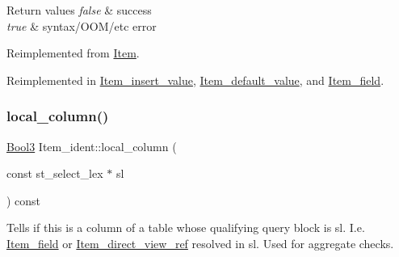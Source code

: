 \begin{DoxyRetVals}{Return values}
{\em false} & success \\
\hline
{\em true} & syntax/\+O\+O\+M/etc error \\
\hline
\end{DoxyRetVals}


Reimplemented from \mbox{\hyperlink{classItem_a0757839d09aa77bfd92bfe071f257ae9}{Item}}.



Reimplemented in \mbox{\hyperlink{classItem__insert__value_a113d00e28d63795bfd89d65dad61e769}{Item\+\_\+insert\+\_\+value}}, \mbox{\hyperlink{classItem__default__value_afb6673a2601e5f5b3f1a80243ce73c67}{Item\+\_\+default\+\_\+value}}, and \mbox{\hyperlink{classItem__field_a6220537b7094a20e4dfb15e229e1a33c}{Item\+\_\+field}}.

\mbox{\label{classItem__ident_aeea35bdf2d88645437b4415824e4b0a8}} 
\subsubsection{\texorpdfstring{local\+\_\+column()}{local\_column()}}
{\footnotesize\ttfamily \mbox{\hyperlink{classBool3}{Bool3}} Item\+\_\+ident\+::local\+\_\+column (\begin{DoxyParamCaption}\item[{const st\+\_\+select\+\_\+lex $\ast$}]{sl }\end{DoxyParamCaption}) const\hspace{0.3cm}{\ttfamily [virtual]}}

Tells if this is a column of a table whose qualifying query block is \textquotesingle{}sl\textquotesingle{}. I.\+e. \mbox{\hyperlink{classItem__field}{Item\+\_\+field}} or \mbox{\hyperlink{classItem__direct__view__ref}{Item\+\_\+direct\+\_\+view\+\_\+ref}} resolved in \textquotesingle{}sl\textquotesingle{}. Used for aggregate checks.

